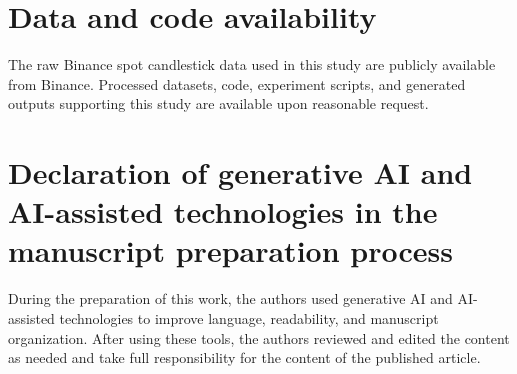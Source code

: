 \documentclass[a4paper,fleqn]{cas-dc}
\begin{document}
\section*{Data and code availability}
The raw Binance spot candlestick data used in this study are publicly available
from Binance. Processed datasets, code, experiment scripts, and generated
outputs supporting this study are available upon reasonable request.

\section*{Declaration of generative AI and AI-assisted technologies in the manuscript preparation process}
During the preparation of this work, the authors used generative AI and
AI-assisted technologies to improve language, readability, and manuscript
organization. After using these tools, the authors reviewed and edited the
content as needed and take full responsibility for the content of the published
article.

\clearpage


\end{document}
